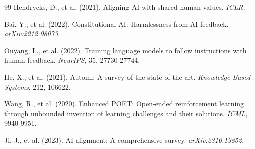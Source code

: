 \documentclass{article}
\begin{document}
\begin{thebibliography}{99}
Hendrycks, D., et al. (2021). Aligning AI with shared human values. \textit{ICLR}.

Bai, Y., et al. (2022). Constitutional AI: Harmlessness from AI feedback. \textit{arXiv:2212.08073}.

Ouyang, L., et al. (2022). Training language models to follow instructions with human feedback. \textit{NeurIPS}, 35, 27730-27744.

He, X., et al. (2021). Automl: A survey of the state-of-the-art. \textit{Knowledge-Based Systems}, 212, 106622.

Wang, R., et al. (2020). Enhanced POET: Open-ended reinforcement learning through unbounded invention of learning challenges and their solutions. \textit{ICML}, 9940-9951.

Ji, J., et al. (2023). AI alignment: A comprehensive survey. \textit{arXiv:2310.19852}.

\end{thebibliography}
\end{document}
